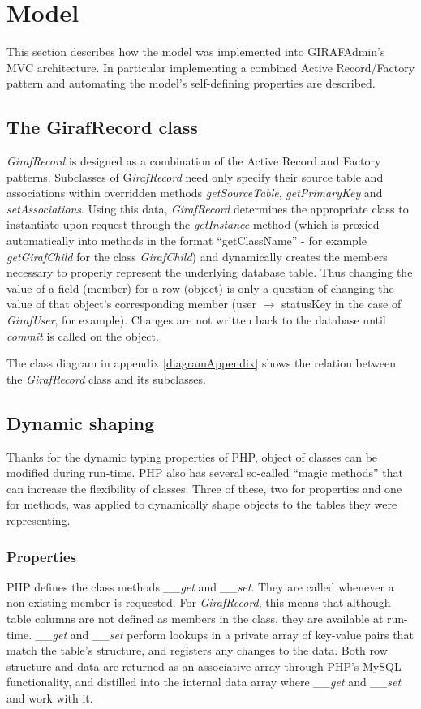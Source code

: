 \section{Model}
\label{model}
This section describes how the model was implemented into GIRAFAdmin's MVC architecture. In particular implementing a combined Active Record/Factory pattern and automating the model's self-defining properties are described.

\subsection{The GirafRecord class}
\emph{GirafRecord} is designed as a combination of the Active Record and Factory patterns. Subclasses of G\emph{irafRecord} need only specify their source table and associations within overridden methods \emph{getSourceTable}, \emph{getPrimaryKey} and \emph{setAssociations}. Using this data, \emph{GirafRecord} determines the appropriate class to instantiate upon request through the \emph{getInstance} method (which is proxied automatically into methods in the format ``getClassName'' - for example \emph{getGirafChild} for the class \emph{GirafChild}) and dynamically creates the members necessary to properly represent the underlying database table. Thus changing the value of a field (member) for a row (object) is only a question of changing the value of that object's corresponding member (user $\rightarrow$ statusKey in the case of \emph{GirafUser}, for example). Changes are not written back to the database until \emph{commit} is called on the object.

The class diagram in appendix \ref{diagramAppendix} shows the relation between the \emph{GirafRecord} class and its subclasses.
\subsection{Dynamic shaping}
Thanks for the dynamic typing properties of PHP, object of classes can be modified during run-time. PHP also has several so-called ``magic methods'' that can increase the flexibility of classes. Three of these, two for properties and one for methods, was applied to dynamically shape objects to the tables they were representing.

\subsubsection*{Properties}
PHP defines the class methods \emph{\_\_get} and \emph{\_\_set}. They are called whenever a non-existing member is requested. For \emph{GirafRecord}, this means that although table columns are not defined as members in the class, they are available at run-time. \emph{\_\_get} and \emph{\_\_set} perform lookups in a private array of key-value pairs that match the table's structure, and registers any changes to the data.
Both row structure and data are returned as an associative array through PHP's MySQL functionality, and distilled into the internal data array where \emph{\_\_get} and \emph{\_\_set} and work with it.


